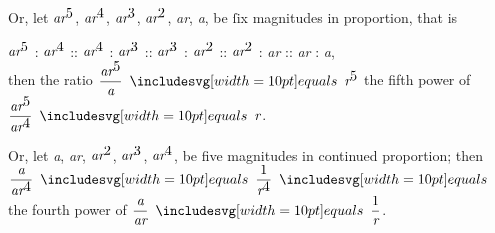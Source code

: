 \documentclass[11pt,preview]{standalone}
\begin{document}
Or, let $\textit{ar}^{\text{\normalsize 5}}$, $\textit{ar}^{\text{\normalsize 4}}$, $\textit{ar}^{\text{\normalsize 3}}$, $\textit{ar}^{\text{\normalsize 2}}$, \textit{ar}, \textit{a}, be ſix magnitudes in proportion, that is

\begin{center}
    $\textit{ar}^{\text{\normalsize 5}}$ : $\textit{ar}^{\text{\normalsize 4}}$ :: $\textit{ar}^{\text{\normalsize 4}}$ : $\textit{ar}^{\text{\normalsize 3}}$ :: $\textit{ar}^{\text{\normalsize 3}}$ : $\textit{ar}^{\text{\normalsize 2}}$ :: $\textit{ar}^{\text{\normalsize 2}}$ : \textit{ar} :: \textit{ar} : \textit{a},\\
    \vspace{1ex}
    then the ratio $\dfrac{\textit{ar}^{\text{\normalsize 5}}}{\textit{a}} \bequals \textit{r}^{\text{\normalsize 5}}$ the fifth power of $\dfrac{\textit{ar}^{\text{\normalsize 5}}}{\textit{ar}^{\text{\normalsize 4}}} \bequals \textit{r}$.
\end{center}

Or, let \textit{a}, \textit{ar}, $\textit{ar}^{\text{\normalsize 2}}$, $\textit{ar}^{\text{\normalsize 3}}$, $\textit{ar}^{\text{\normalsize 4}}$, be five magnitudes in continued proportion; then $\dfrac{\textit{a}}{\textit{ar}^{\text{\normalsize 4}}} \bequals \dfrac{1}{\textit{r}^{\text{\normalsize 4}}} \bequals$ the fourth power of $\dfrac{\textit{a}}{\textit{ar}} \bequals \dfrac{1}{\textit{r}}$.
\end{document}
